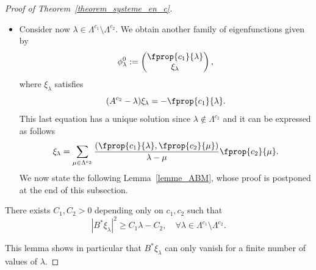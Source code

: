\begin{proof}[Proof of Theorem~\ref{theorem_systeme_en_c}]
\begin{itemize}
\begin{itemize}
\begin{itemize}
\item Assume now that $\beta_\lambda\neq 0$. In that case, $\lambda$ is geometrically simple but there exists a generalized eigenfunction $\phi_\lambda^1$ associated with $\phi_\lambda^0$ of the following form
\[
\phi_\lambda^1 := \frac{1}{\beta_\lambda}
\begin{pmatrix} \fprop{c_1}{\lambda} \\ \chi_\lambda
\end{pmatrix},
\]


where $\chi_\lambda$ is the unique solution of
\[
(A^{c_2} - \lambda) \chi_\lambda = \beta_\lambda \fprop{c_2}{\lambda} - \fprop{c_1}{\lambda},
\]
that satisfy $B^*\chi_\lambda=0$.

We can express $\chi_\lambda$ in the basis $\fprop{c_2}{\cdot}$ as follows
\[
\chi_\lambda=a_\lambda \fprop{c_2}{\lambda} - \sum_{\substack{\mu\in \Lambda^{c_2}\\ \mu \neq \lambda}} \frac{(\fprop{c_1}{\lambda},\fprop{c_2}{\mu})}{\lambda-\mu} \fprop{c_2}{\mu},
\]
with
\[
a_\lambda = \frac{1}{B^*\fprop{c_2}{\lambda}} \sum_{\substack{\mu\in \Lambda^{c_2}\\ \mu \neq \lambda}} \frac{(\fprop{c_1}{\lambda},\fprop{c_2}{\mu})}{\lambda-\mu} B^* \fprop{c_2}{\mu}.
\]
\end{itemize}
\end{itemize}
\item Consider now $\lambda\in \Lambda^{c_1}\setminus \Lambda^{c_2}$. We obtain another family of eigenfunctions given by
\begin{equation}\label{systeme_en_c_fp2}
\phi_\lambda^0 :=
\begin{pmatrix} \fprop{c_1}{\lambda} \\ \xi_\lambda
\end{pmatrix},
\end{equation}
where $\xi_\lambda$ satisfies
\[
(A^{c_2}-\lambda) \xi_\lambda = - \fprop{c_1}{\lambda}.
\]
This last equation has a unique solution since $\lambda\not\in \Lambda^{c_2}$ and it can be expressed as follows
\begin{equation}\label{def_xi_lambda}
\xi_\lambda = \sum_{\mu\in \Lambda^{c_2}} \frac{(\fprop{c_1}{\lambda},\fprop{c_2}{\mu})}{\lambda-\mu} \fprop{c_2}{\mu}.
\end{equation}
We now state the following Lemma~\ref{lemme_ABM}, whose proof is postponed at the end of this subsection.
\end{itemize}
\begin{lemm}\label{lemme_ABM}
There exists $C_1,C_2>0$ depending only on $c_1, c_2$ such that
\begin{equation}\label{ABM_xi_lambda}
|B^* \xi_\lambda|^2 \geq C_1 \lambda - C_2, \quad \forall \lambda\in \Lambda^{c_1}\setminus \Lambda^{c_2}.
\end{equation}
\end{lemm}
This lemma shows in particular that $B^* \xi_\lambda$ can only vanish for a finite number of values of $\lambda$.



\end{proof}
